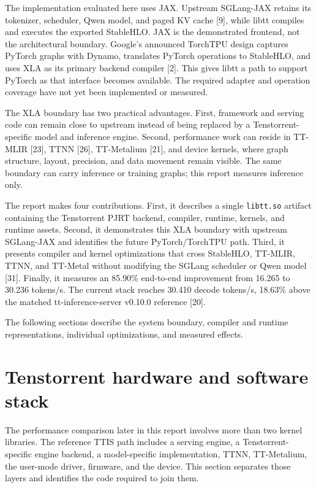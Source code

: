 \documentclass[
  10pt,
  american,
  10pt,
  letterpaper]{article}
\begin{document}
The implementation evaluated here uses JAX. Upstream SGLang-JAX retains
its tokenizer, scheduler, Qwen model, and paged KV cache {[}9{]}, while
libtt compiles and executes the exported StableHLO. JAX is the
demonstrated frontend, not the architectural boundary. Google's
announced TorchTPU design captures PyTorch graphs with Dynamo,
translates PyTorch operations to StableHLO, and uses XLA as its primary
backend compiler {[}2{]}. This gives libtt a path to support PyTorch as
that interface becomes available. The required adapter and operation
coverage have not yet been implemented or measured.

The XLA boundary has two practical advantages. First, framework and
serving code can remain close to upstream instead of being replaced by a
Tenstorrent-specific model and inference engine. Second, performance
work can reside in TT-MLIR {[}23{]}, TTNN {[}26{]}, TT-Metalium
{[}21{]}, and device kernels, where graph structure, layout, precision,
and data movement remain visible. The same boundary can carry inference
or training graphs; this report measures inference only.

The report makes four contributions. First, it describes a single
\texttt{libtt.so} artifact containing the Tenstorrent PJRT backend,
compiler, runtime, kernels, and runtime assets. Second, it demonstrates
this XLA boundary with upstream SGLang-JAX and identifies the future
PyTorch/TorchTPU path. Third, it presents compiler and kernel
optimizations that cross StableHLO, TT-MLIR, TTNN, and TT-Metal without
modifying the SGLang scheduler or Qwen model {[}31{]}. Finally, it
measures an 85.90\% end-to-end improvement from 16.265 to 30.236
tokens/s. The current stack reaches 30.410 decode tokens/s, 18.63\%
above the matched tt-inference-server v0.10.0 reference {[}20{]}.

The following sections describe the system boundary, compiler and
runtime representations, individual optimizations, and measured effects.

\hypertarget{tenstorrent-hardware-and-software-stack}{%
\section{Tenstorrent hardware and software
stack}\label{tenstorrent-hardware-and-software-stack}}

The performance comparison later in this report involves more than two
kernel libraries. The reference TTIS path includes a serving engine, a
Tenstorrent-specific engine backend, a model-specific implementation,
TTNN, TT-Metalium, the user-mode driver, firmware, and the device. This
section separates those layers and identifies the code required to join
them.
\end{document}
